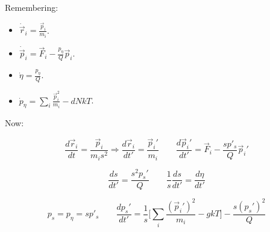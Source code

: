 	Remembering:

	\begin{multicols}{2}
		\begin{itemize}
			\item $\dot{\vec{r}}_i = \frac{\vec{p}_i}{m_i}$.
			\item $\dot{\vec{p}}_i = \vec{F}_i-\frac{p_\eta}{Q}\vec{p}_i$.
			\item $\dot{\eta} = \frac{p_\eta}{Q}$.
			\item $\dot{p}_\eta = \sum\limits_{i}\frac{\vec{p}_i^2}{m_i}-dNkT$.
		\end{itemize}
	\end{multicols}

	Now:

	$$\frac{d\vec{r}_i}{dt} = \frac{\vec{p}_i}{m_is^2}\Rightarrow\frac{d\vec{r}_i}{dt'} = \frac{\vec{p}_i'}{m_i}\qquad \frac{d\vec{p}_i'}{dt'} = \vec{F}_i-\frac{sp'_s}{Q}\vec{p}_i'$$

	$$\frac{ds}{dt'} = \frac{s^2p_s'}{Q}\qquad \frac{1}{s}\frac{ds}{dt'} = \frac{d\eta}{dt'}$$

	$$p_s = p_\eta = sp'_s\qquad \frac{dp_s'}{dt'} = \frac{1}{s}\biggl[\sum\limits_{i} \frac{(\vec{p}_i')^2}{m_i}-gkT\biggr] - \frac{s(p_s')^2}{Q}$$
